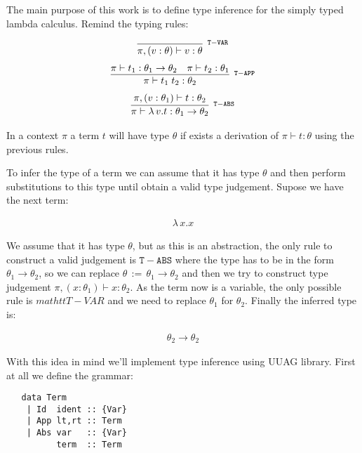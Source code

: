 \documentclass[a4paper,10pt]{article}
\newcommand{\typejud}[3] {
  \ensuremath{#1 \vdash #2 : #3}
}
\begin{document}
 The main purpose of this work is to define type inference for the simply typed lambda calculus. Remind the typing rules:
 
 \begin{align*}
 \infer[^{\mathtt{T-VAR}}]
       {\typejud{\pi,(v:\theta)}{v}{\theta}}
       {}
 \end{align*}
  \begin{align*}
  \infer[^{\mathtt{T-APP}}]
       {\typejud{\pi}{t_1\;t_2}{\theta_2}}
       {\typejud{\pi}{t_1}{\theta_1\rightarrow\theta_2} &
        \typejud{\pi}{t_2}{\theta_1}
       }
  \end{align*}
  \begin{align*}
  \infer[^{\mathtt{T-ABS}}]
       {\typejud{\pi}{\lambda\,v.t}{\theta_1 \rightarrow \theta_2}}
       {\typejud{\pi,(v:\theta_1)}{t}{\theta_2}
       }
  \end{align*}
 
 In a context $\pi$ a term $t$ will have type $\theta$ if exists a derivation of
 $\typejud{\pi}{t}{\theta}$ using the previous rules.
 
 To infer the type of a term we can assume that it has type $\theta$ and then perform substitutions
 to this type until obtain a valid type judgement. Supose we have the next term:
 
 \begin{align*}
    \lambda\,x.x
 \end{align*}

 We assume that it has type $\theta$, but as this is an abstraction, the only rule to construct a valid
 judgement is $\mathtt{T-ABS}$ where the type has to be in the form $\theta_1 \rightarrow \theta_2$,
 so we can replace $\theta\,:=\,\theta_1 \rightarrow \theta_2$ and then we try to construct type judgement
 $\typejud{\pi,(x:\theta_1)}{x}{\theta_2}$. As the term now is a variable, the only possible rule
 is $mathtt{T-VAR}$ and we need to replace $\theta_1$ for $\theta_2$. Finally the inferred type is:
 
  \begin{align*}
    {\theta_2 \rightarrow \theta_2}
  \end{align*} 
 
 \medskip
 
  With this idea in mind we'll implement type inference using UUAG library. First at all we define the grammar:
  
  \begin{lstlisting}
   data Term
	| Id  ident :: {Var}
	| App lt,rt :: Term
	| Abs var   :: {Var}
	      term  :: Term
  \end{lstlisting}
\end{document}
